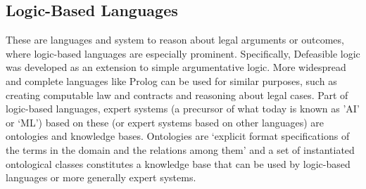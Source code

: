 \documentclass[conference]{IEEEtran}
\begin{document}
\subsection{Logic-Based Languages}
These are languages and system to reason about legal arguments or outcomes, where logic-based languages are especially prominent.
Specifically, Defeasible logic \cite{nute_defeasible_1993,garciaDefeasibleLogicProgramming2002} was developed as an extension to simple argumentative logic. More widespread and complete languages like Prolog \cite{SWIPrologManual} %
can be used for similar purposes, such as creating computable law and contracts and reasoning about legal cases.
Part of logic-based languages, expert systems (a precursor of what today is known as 'AI’ or ‘ML’) based on these (or expert systems based on other languages) are ontologies and knowledge bases.  Ontologies  are ‘explicit format specifications of the terms in the domain and the relations among them’ \cite{natalyaf.noyOntologyDevelopment101} and a set of instantiated ontological classes constitutes a knowledge base that can be used by logic-based languages or more generally expert systems.
\end{document}
